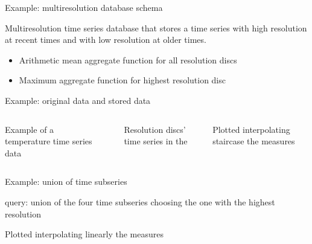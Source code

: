 



\begin{frame}{Example: multiresolution database schema}

  Multiresolution time series database that stores a time series with
  high resolution at recent times and with low resolution at older
  times.


\begin{center}
  \setlength{\unitlength}{1.3mm}
  
\end{center}

\begin{itemize}
\item Arithmetic mean aggregate function for all resolution discs

\item Maximum aggregate function for  highest resolution disc

\end{itemize}



\end{frame}



\begin{frame}{Example: original data and stored data}

  \begin{columns}[l]
    Example of a temperature time series data

   \begin{center}
      
    \end{center}


   Resolution discs' time series in the 

      
   {\footnotesize Plotted interpolating staircase the measures}

 

  \end{columns}

\end{frame}



\begin{frame}{Example: union of time subseries}

   query: union of the four time subseries choosing
  the one with the highest resolution

  \begin{center}
    

   {\footnotesize Plotted interpolating linearly the measures}

  \end{center}


\end{frame}



